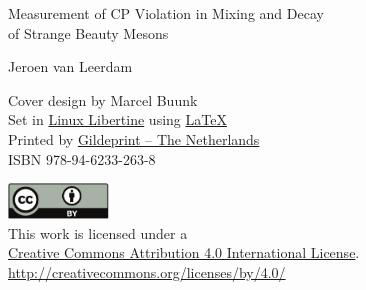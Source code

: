\thispagestyle{empty}
\begin{center}

  {\Large
  Measurement of CP Violation in Mixing and Decay\\
  of Strange Beauty Mesons}




  {\large
  Jeroen van Leerdam}

\end{center}

\newpage
\thispagestyle{empty}

\begin{center}
  Cover design by Marcel Buunk \\

  Set in \href{http://www.linuxlibertine.org/}{Linux Libertine} using \href{https://latex-project.org/}{\LaTeX} \\
  Printed by \href{http://www.gildeprint.nl/}{Gildeprint -- The Netherlands}\\
  ISBN 978-94-6233-263-8\\


  \href{http://creativecommons.org/licenses/by/4.0/}{\includegraphics[width=0.2\textwidth]{graphics/title/cc_by_cmyk}}\\
  This work is licensed under a\\
  \href{http://creativecommons.org/licenses/by/4.0/}{Creative Commons Attribution 4.0 International License}.\\
  \href{http://creativecommons.org/licenses/by/4.0/}{http://creativecommons.org/licenses/by/4.0/}

\end{center}


